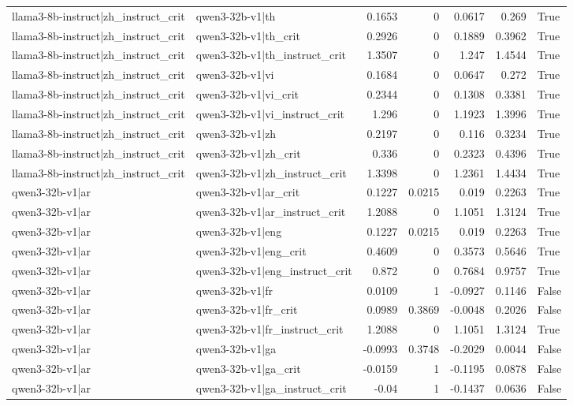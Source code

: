 \begin{table}
\begin{tabular}{l l r r r r l}
llama3-8b-instruct|zh_instruct_crit & qwen3-32b-v1|th & 0.1653 & 0 & 0.0617 & 0.269 & True \\
llama3-8b-instruct|zh_instruct_crit & qwen3-32b-v1|th_crit & 0.2926 & 0 & 0.1889 & 0.3962 & True \\
llama3-8b-instruct|zh_instruct_crit & qwen3-32b-v1|th_instruct_crit & 1.3507 & 0 & 1.247 & 1.4544 & True \\
llama3-8b-instruct|zh_instruct_crit & qwen3-32b-v1|vi & 0.1684 & 0 & 0.0647 & 0.272 & True \\
llama3-8b-instruct|zh_instruct_crit & qwen3-32b-v1|vi_crit & 0.2344 & 0 & 0.1308 & 0.3381 & True \\
llama3-8b-instruct|zh_instruct_crit & qwen3-32b-v1|vi_instruct_crit & 1.296 & 0 & 1.1923 & 1.3996 & True \\
llama3-8b-instruct|zh_instruct_crit & qwen3-32b-v1|zh & 0.2197 & 0 & 0.116 & 0.3234 & True \\
llama3-8b-instruct|zh_instruct_crit & qwen3-32b-v1|zh_crit & 0.336 & 0 & 0.2323 & 0.4396 & True \\
llama3-8b-instruct|zh_instruct_crit & qwen3-32b-v1|zh_instruct_crit & 1.3398 & 0 & 1.2361 & 1.4434 & True \\
qwen3-32b-v1|ar & qwen3-32b-v1|ar_crit & 0.1227 & 0.0215 & 0.019 & 0.2263 & True \\
qwen3-32b-v1|ar & qwen3-32b-v1|ar_instruct_crit & 1.2088 & 0 & 1.1051 & 1.3124 & True \\
qwen3-32b-v1|ar & qwen3-32b-v1|eng & 0.1227 & 0.0215 & 0.019 & 0.2263 & True \\
qwen3-32b-v1|ar & qwen3-32b-v1|eng_crit & 0.4609 & 0 & 0.3573 & 0.5646 & True \\
qwen3-32b-v1|ar & qwen3-32b-v1|eng_instruct_crit & 0.872 & 0 & 0.7684 & 0.9757 & True \\
qwen3-32b-v1|ar & qwen3-32b-v1|fr & 0.0109 & 1 & -0.0927 & 0.1146 & False \\
qwen3-32b-v1|ar & qwen3-32b-v1|fr_crit & 0.0989 & 0.3869 & -0.0048 & 0.2026 & False \\
qwen3-32b-v1|ar & qwen3-32b-v1|fr_instruct_crit & 1.2088 & 0 & 1.1051 & 1.3124 & True \\
qwen3-32b-v1|ar & qwen3-32b-v1|ga & -0.0993 & 0.3748 & -0.2029 & 0.0044 & False \\
qwen3-32b-v1|ar & qwen3-32b-v1|ga_crit & -0.0159 & 1 & -0.1195 & 0.0878 & False \\
qwen3-32b-v1|ar & qwen3-32b-v1|ga_instruct_crit & -0.04 & 1 & -0.1437 & 0.0636 & False \\

\end{tabular}
\end{table}
